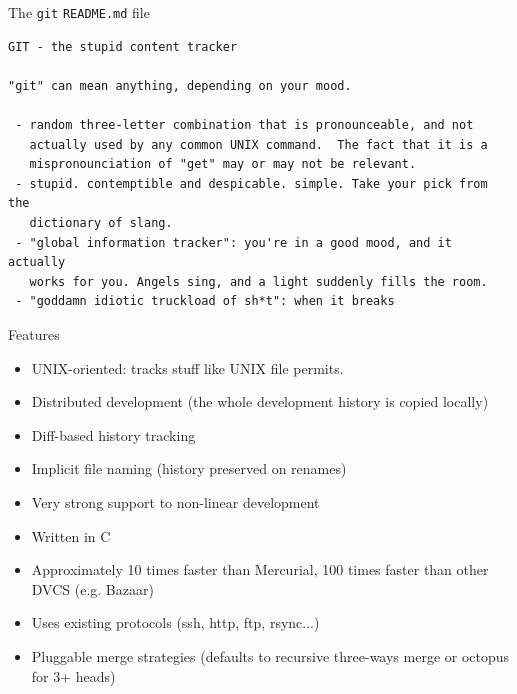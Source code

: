 \documentclass[presentation]{beamer}
\begin{document}
\begin{frame}[fragile]{The \texttt{git} \texttt{README.md} file}
	\begin{block}{}
		\begin{verbatim}
GIT - the stupid content tracker

"git" can mean anything, depending on your mood.

 - random three-letter combination that is pronounceable, and not
   actually used by any common UNIX command.  The fact that it is a
   mispronounciation of "get" may or may not be relevant.
 - stupid. contemptible and despicable. simple. Take your pick from the
   dictionary of slang.
 - "global information tracker": you're in a good mood, and it actually
   works for you. Angels sing, and a light suddenly fills the room. 
 - "goddamn idiotic truckload of sh*t": when it breaks
		\end{verbatim}
	\end{block}
\end{frame}

\begin{frame}[fragile]{Features}
	\begin{itemize}
		\item UNIX-oriented: tracks stuff like UNIX file permits.
		\item Distributed development (the whole development history is copied locally)
		\item Diff-based history tracking
		\item Implicit file naming (history preserved on renames)
		\item Very strong support to non-linear development
		\item Written in C
		\item Approximately 10 times faster than Mercurial, 100 times faster than other DVCS (e.g. Bazaar)
		\item Uses existing protocols (ssh, http, ftp, rsync...)
		\item Pluggable merge strategies (defaults to recursive three-ways merge or octopus for 3+ heads)
	\end{itemize}
\end{frame}
\end{document}
